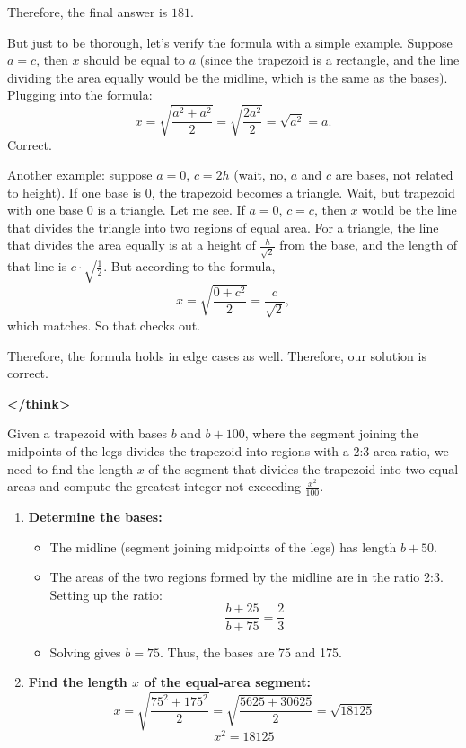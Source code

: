 \begin{tcolorbox}[
  title=Multiagent Collaborative Reasoning Trace Data Sample,
  breakable,
  colback=white,
  colframe=black
]
Therefore, the final answer is \( \boxed{181} \).

But just to be thorough, let's verify the formula with a simple example. Suppose \( a = c \), then \( x \) should be equal to \( a \) (since the trapezoid is a rectangle, and the line dividing the area equally would be the midline, which is the same as the bases). Plugging into the formula: 
\[
x = \sqrt{ \frac{a^2 + a^2}{2} } = \sqrt{ \frac{2a^2}{2} } = \sqrt{a^2} = a.
\]
Correct.

Another example: suppose \( a = 0 \), \( c = 2h \) (wait, no, \( a \) and \( c \) are bases, not related to height). If one base is 0, the trapezoid becomes a triangle. Wait, but trapezoid with one base 0 is a triangle. Let me see. If \( a = 0 \), \( c = c \), then \( x \) would be the line that divides the triangle into two regions of equal area. For a triangle, the line that divides the area equally is at a height of \( \frac{h}{\sqrt{2}} \) from the base, and the length of that line is \( c \cdot \sqrt{\frac{1}{2}} \). But according to the formula,
\[
x = \sqrt{ \frac{0 + c^2}{2} } = \frac{c}{\sqrt{2}},
\]
which matches. So that checks out.

Therefore, the formula holds in edge cases as well. Therefore, our solution is correct.

\textbf{\textless/think\textgreater}

Given a trapezoid with bases \( b \) and \( b + 100 \), where the segment joining the midpoints of the legs divides the trapezoid into regions with a 2:3 area ratio, we need to find the length \( x \) of the segment that divides the trapezoid into two equal areas and compute the greatest integer not exceeding \( \frac{x^2}{100} \).

\begin{enumerate}
  \item \textbf{Determine the bases:}
    \begin{itemize}
      \item The midline (segment joining midpoints of the legs) has length \( b + 50 \).
      \item The areas of the two regions formed by the midline are in the ratio 2:3. Setting up the ratio:
        \[
        \frac{b + 25}{b + 75} = \frac{2}{3}
        \]
      \item Solving gives \( b = 75 \). Thus, the bases are 75 and 175.
    \end{itemize}

  \item \textbf{Find the length \( x \) of the equal-area segment:}
    \[
    x = \sqrt{\frac{75^2 + 175^2}{2}} = \sqrt{\frac{5625 + 30625}{2}} = \sqrt{18125}
    \]
    \[
    x^2 = 18125
    \]


\end{enumerate}
\end{tcolorbox}
